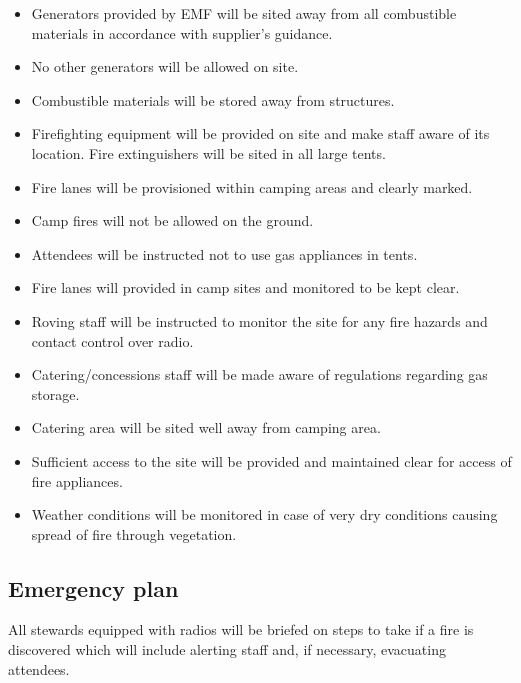 \begin{itemize}
\item Generators provided by EMF will be sited away from all combustible materials in accordance with supplier's guidance.
\item No other generators will be allowed on site.
\item Combustible materials will be stored away from structures.
\item Firefighting equipment will be provided on site and make staff aware of its location. Fire extinguishers will be sited in all large tents.
\item Fire lanes will be provisioned within camping areas and clearly marked.
\item Camp fires will not be allowed on the ground.
\item Attendees will be instructed not to use gas appliances in tents.
\item Fire lanes will provided in camp sites and monitored to be kept clear.
\item Roving staff will be instructed to monitor the site for any fire hazards and contact control over radio.
\item Catering/concessions staff will be made aware of regulations regarding gas storage.
\item Catering area will be sited well away from camping area.
\item Sufficient access to the site will be provided and maintained clear for access of fire appliances.
\item Weather conditions will be monitored in case of very dry conditions causing spread of fire through vegetation.
\end{itemize}

\subsection{Emergency plan}

All stewards equipped with radios will be briefed on steps to take if a fire is discovered which
will include alerting staff and, if necessary, evacuating attendees.


